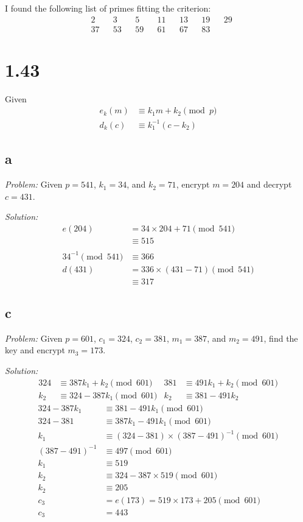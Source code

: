 \documentclass[12pt]{article}
\begin{document}
I found the following list of primes fitting the criterion:
\begin{align*}
&2 & &3 & &5 & &11 & &13 & &19 & &29 \\
&37 & &53 & &59 & &61 & &67 & &83
\end{align*}

\section*{1.43}
Given
\begin{align*}
    e_k(m) &\equiv k_1 m + k_2 \pmod{p} \\
    d_k(c) &\equiv k_1^{-1} (c - k_2)
\end{align*}
\subsection*{a}
\textit{Problem:} Given $p = 541$, $k_1 = 34$, and $k_2 = 71$, encrypt $m = 204$ and decrypt $c = 431$.

\textit{Solution:}
\begin{align*}
    e(204) &= 34 \times 204 + 71 \pmod{541} \\
    &\equiv \boxed{515} \\
    \\
    34^{-1} \pmod{541} &\equiv 366 \\
    d(431) &= 336 \times (431 - 71) \pmod{541} \\
    &\equiv \boxed{317}
\end{align*}

\subsection*{c}
\textit{Problem:} Given $p = 601$, $c_1 = 324$, $c_2 = 381$, $m_1 = 387$, and $m_2 = 491$, find the key and encrypt $m_3 = 173$.

\textit{Solution:}
\begin{align*}
    324 &\equiv 387 k_1 + k_2 \pmod{601} & 381 &\equiv 491 k_1 + k_2 \pmod{601} \\
    k_2 &\equiv 324 - 387k_1 \pmod{601} & k_2 &\equiv 381 - 491 k_2
\end{align*}
\begin{align*}
    324 - 387 k_1 &\equiv 381 - 491 k_1 \pmod{601} \\
    324 - 381 &\equiv 387 k_1 - 491 k_1 \pmod{601} \\
    k_1 &\equiv (324 - 381) \times (387 - 491)^{-1} \pmod{601} \\
    (387 - 491)^{-1} &\equiv 497 \pmod{601} \\
    k_1 &\equiv 519 \\
    k_2 &\equiv 324 - 387 \times 519 \pmod{601} \\
    k_2 &\equiv 205 \\
    c_3 &= e(173) = 519 \times 173 + 205 \pmod{601} \\
    c_3 &= \boxed{443}
\end{align*}
\end{document}

